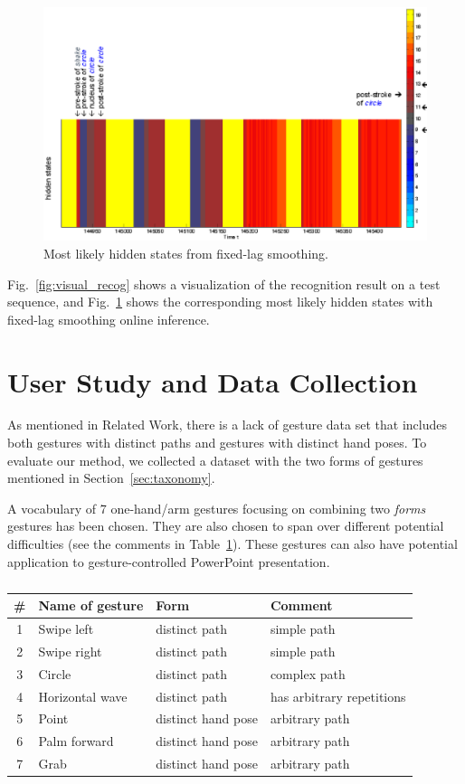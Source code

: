 \documentclass[conference]{IEEEtran}
\begin{document}
\begin{figure}[t]
\centering
\includegraphics[width=\columnwidth]{fig/circle_shake_label.ps}
\caption{Most likely hidden states from fixed-lag smoothing.}
\label{fig:visual_hidden}
\end{figure}

Fig.~\ref{fig:visual_recog} shows a visualization of the recognition result on a
test sequence, and Fig.~\ref{fig:visual_hidden} shows the corresponding
most likely hidden states with fixed-lag smoothing online inference.

\section{User Study and Data Collection}
As mentioned in Related Work, there is a lack of gesture data set that
includes both gestures with distinct paths and gestures with distinct hand
poses. To evaluate our method, we collected a dataset with the two forms of
gestures mentioned in Section~\ref{sec:taxonomy}.

A vocabulary of 7 one-hand/arm gestures focusing on combining two \textit{forms}
gestures has been chosen. They are also chosen to span over
different potential difficulties (see the comments in Table~\ref{tab:gestures}).
These gestures can also have potential application to gesture-controlled
PowerPoint presentation.

\begin{table}
\caption{}
\label{tab:gestures}
\centering
\begin{tabular}{|c|l|l|l|}
\hline
\# & Name of gesture & Form & Comment \\
\hline
1 & Swipe left & distinct path & simple path \\
\hline
2 & Swipe right & distinct path & simple path \\
\hline
3 & Circle & distinct path & complex path \\
\hline
4 & Horizontal wave & distinct path & has arbitrary repetitions \\
\hline
5 & Point & distinct hand pose & arbitrary path \\
\hline
6 & Palm forward & distinct hand pose & arbitrary path \\
\hline
7 & Grab & distinct hand pose & arbitrary path \\
\hline
\end{tabular}
\end{table}
\end{document}

